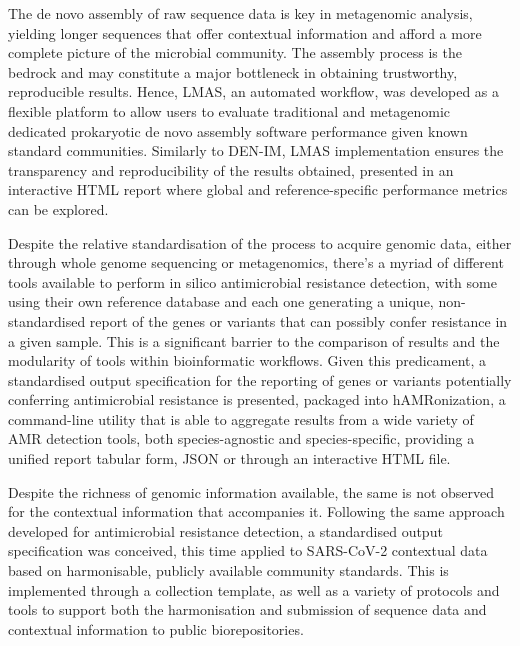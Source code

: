 The de novo assembly of raw sequence data is key in metagenomic analysis, yielding longer sequences that offer contextual information and afford a more complete picture of the microbial community. The assembly process is the bedrock and may constitute a major bottleneck in obtaining trustworthy, reproducible results. Hence, LMAS, an automated workflow, was developed as a flexible platform to allow users to evaluate traditional and metagenomic dedicated prokaryotic de novo assembly software performance given known standard communities. Similarly to DEN-IM, LMAS implementation ensures the transparency and reproducibility of the results obtained, presented in an interactive HTML report where global and reference-specific performance metrics can be explored. 

Despite the relative standardisation of the process to acquire genomic data, either through whole genome sequencing or metagenomics, there’s a myriad of different tools available to perform in silico antimicrobial resistance detection, with some using their own reference database and each one generating a unique, non-standardised report of the genes or variants that can possibly confer resistance in a given sample. This is a significant barrier to the comparison of results and the modularity of tools within bioinformatic workflows. Given this predicament, a standardised output specification for the reporting of genes or variants potentially conferring antimicrobial resistance is presented, packaged into hAMRonization, a command-line utility that is able to aggregate results from a wide variety of AMR detection tools, both species-agnostic and species-specific, providing a unified report tabular form, JSON or through an interactive HTML file. 

Despite the richness of genomic information available, the same is not observed for the contextual information that accompanies it. Following the same approach developed for antimicrobial resistance detection, a standardised output specification was conceived, this time applied to SARS-CoV-2 contextual data based on harmonisable, publicly available community standards. This is implemented through a collection template, as well as a variety of protocols and tools to support both the harmonisation and submission of sequence data and contextual information to public biorepositories. 

